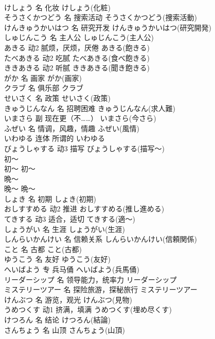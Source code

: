 \documentclass[8pt]{extreport}
\begin{document}
\begin{CJK}{UTF8}{min}
\\	けしょう	名	化妆	けしょう(化粧)	
\\	そうさくかつどう	名	搜索活动	そうさくかつどう(捜索活動)	
\\	けんきゅうかいはつ	名	研究开发	けんきゅうかいはつ(研究開発)	
\\	しゅじんこう	名	主人公	しゅじんこう(主人公)	
\\	あきる	动2	腻烦，厌烦，厌倦	あきる(飽きる)	
\\	たべあきる	动2	吃腻	たべあきる(食べ飽きる)	
\\	ききあきる	动2	听腻	ききあきる(聞き飽きる)	
\\	がか	名	画家	がか(画家)	
\\	クラブ	名	俱乐部	クラブ	
\\	せいさく	名	政策	せいさく(政策)	
\\	きゅうじんなん	名	招聘困难	きゅうじんなん(求人難)	
\\	いまさら	副	现在更（不……）	いまさら(今さら)	
\\	ふぜい	名	情调，风趣，情趣	ふぜい(風情)	
\\	いわゆる	连体	所谓的	いわゆる	
\\	びょうしゃする	动3	描写	びょうしゃする(描写～)	
\\	初～	
\\	初～	初～	
\\	晩～	
\\	晚～	晩～	
\\	しょき	名	初期	しょき(初期)	
\\	おしすすめる	动2	推进	おしすすめる(推し進める)	
\\	てきする	动3	适合，适切	てきする(適～)	
\\	しょうがい	名	生涯	しょうがい(生涯)	
\\	しんらいかんけい	名	信赖关系	しんらいかんけい(信頼関係)	
\\	こと	名	古都	こと(古都)	
\\	ゆうこう	名	友好	ゆうこう(友好)	
\\	へいばよう	专	兵马俑	へいばよう(兵馬俑)	
\\	リーダーシップ	名	领导能力，统率力	リーダーシップ	
\\	ミステリーツアー	名	探险旅游，探秘旅行	ミステリーツアー	
\\	けんぶつ	名	游览，观光	けんぶつ(見物)	
\\	うめつくす	动1	挤满，填满	うめつくす(埋め尽くす)	
\\	けつろん	名	结论	けつろん(結論)	
\\	さんちょう	名	山顶	さんちょう(山頂)	

\end{CJK}
\end{document}
